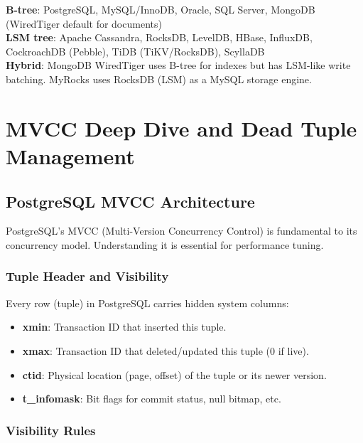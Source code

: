 \documentclass[12pt,a4paper]{article}
\begin{document}
\begin{infobox}
\textbf{B-tree}: PostgreSQL, MySQL/InnoDB, Oracle, SQL Server, MongoDB (WiredTiger default for documents)\\
\textbf{LSM tree}: Apache Cassandra, RocksDB, LevelDB, HBase, InfluxDB, CockroachDB (Pebble), TiDB (TiKV/RocksDB), ScyllaDB\\
\textbf{Hybrid}: MongoDB WiredTiger uses B-tree for indexes but has LSM-like write batching. MyRocks uses RocksDB (LSM) as a MySQL storage engine.
\end{infobox}


\section{MVCC Deep Dive and Dead Tuple Management}

\subsection{PostgreSQL MVCC Architecture}

PostgreSQL's MVCC (Multi-Version Concurrency Control) is fundamental to its concurrency model. Understanding it is essential for performance tuning.

\subsubsection{Tuple Header and Visibility}

Every row (tuple) in PostgreSQL carries hidden system columns:

\begin{itemize}
    \item \textbf{xmin}: Transaction ID that inserted this tuple.
    \item \textbf{xmax}: Transaction ID that deleted/updated this tuple (0 if live).
    \item \textbf{ctid}: Physical location (page, offset) of the tuple or its newer version.
    \item \textbf{t\_infomask}: Bit flags for commit status, null bitmap, etc.
\end{itemize}

\subsubsection{Visibility Rules}
\end{document}
